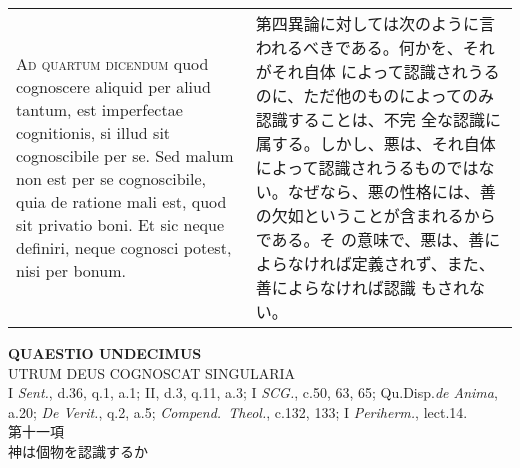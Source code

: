 \documentclass[10pt]{jsarticle} %
\begin{document}
\begin{longtable}{p{21em}p{21em}}
\\


{\scshape Ad quartum dicendum} quod cognoscere aliquid per aliud
tantum, est imperfectae cognitionis, si illud sit cognoscibile per
se. Sed malum non est per se cognoscibile, quia de ratione mali est,
quod sit privatio boni. Et sic neque definiri, neque cognosci potest,
nisi per bonum.

&

第四異論に対しては次のように言われるべきである。何かを、それがそれ自体
によって認識されうるのに、ただ他のものによってのみ認識することは、不完
全な認識に属する。しかし、悪は、それ自体によって認識されうるものではな
い。なぜなら、悪の性格には、善の欠如ということが含まれるからである。そ
の意味で、悪は、善によらなければ定義されず、また、善によらなければ認識
もされない。


\end{longtable}
\newpage




\begin{center}
{\Large {\bf QUAESTIO UNDECIMUS}}\\ {\large UTRUM DEUS COGNOSCAT
SINGULARIA}\\ {\footnotesize I {\itshape Sent.}, d.36, q.1, a.1;
II, d.3, q.11, a.3; I {\itshape SCG.}, c.50, 63, 65;
Qu.Disp.{\itshape de Anima}, a.20; {\itshape De Verit.}, q.2,
a.5; {\itshape Compend.~Theol.}, c.132, 133; I {\itshape Periherm.},
lect.14.}\\ {\Large 第十一項\\神は個物を認識するか}
\end{center}
\end{document}
